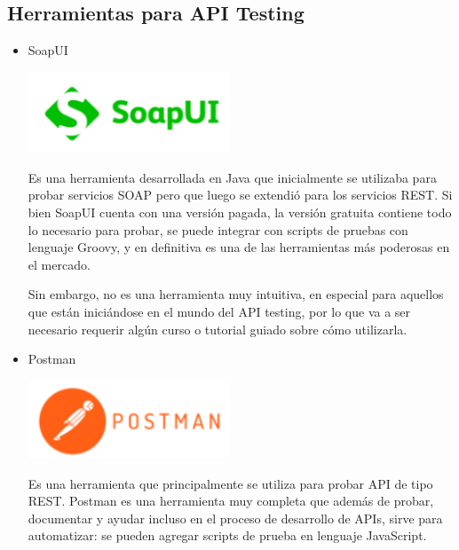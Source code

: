 \documentclass[twoside,twocolumn]{article}
\begin{document}
\subsection{Herramientas para API Testing}
\begin{itemize}
\item SoapUI
\begin{center}
	\includegraphics[width=6cm]{./imagenes/soapui.png} 
	\end{center}
Es una herramienta desarrollada en Java que inicialmente se utilizaba para probar servicios SOAP pero que luego se extendió para los servicios REST. Si bien SoapUI cuenta con una versión pagada, la versión gratuita contiene todo lo necesario para probar, se puede integrar con scripts de pruebas con lenguaje Groovy, y en definitiva es una de las herramientas más poderosas en el mercado.

Sin embargo, no es una herramienta muy intuitiva, en especial para aquellos que están iniciándose en el mundo del API testing, por lo que va a ser necesario requerir algún curso o tutorial guiado sobre cómo utilizarla.
\\
\item Postman
\begin{center}
	\includegraphics[width=6cm]{./imagenes/postman.png} 
	\end{center}
Es una herramienta que principalmente se utiliza para probar API de tipo REST. Postman es una herramienta muy completa que además de probar, documentar y ayudar incluso en el proceso de desarrollo de APIs, sirve para automatizar: se pueden agregar scripts de prueba en lenguaje JavaScript.


\end{itemize}
\end{document}
